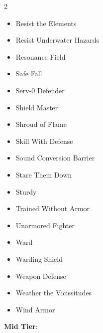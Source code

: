 \begin{multicols}{2}
\begin{itemize}
\item Resist the Elements
\item Resist Underwater Hazards
\item Resonance Field
\item Safe Fall
\item Serv-0 Defender
\item Shield Master
\item Shroud of Flame
\item Skill With Defense
\item Sound Conversion Barrier
\item Stare Them Down
\item Sturdy
\item Trained Without Armor
\item Unarmored Fighter
\item Ward
\item Warding Shield
\item Weapon Defense
\item Weather the Vicissitudes
\item Wind Armor
\end{itemize}

\textbf{Mid Tier}:


\end{multicols}
